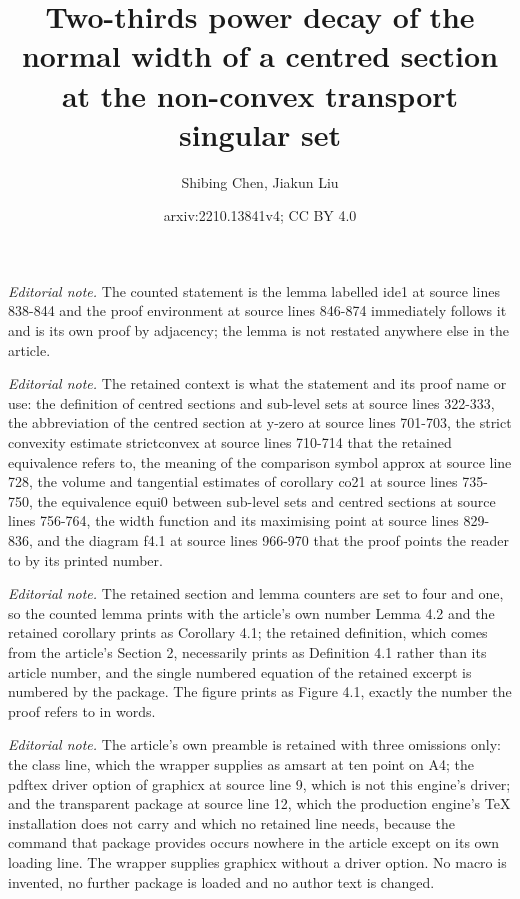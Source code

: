 \documentclass[10pt,a4paper]{amsart}
\title{Two-thirds power decay of the normal width of a centred section at the non-convex transport singular set}
\author{Shibing Chen, Jiakun Liu}
\date{arxiv:2210.13841v4; CC BY 4.0}
\theoremstyle{plain}
\newcommand{\0}{\textbf{0}}
\numberwithin{equation}{section}
\numberwithin{equation}{section}
\numberwithin{figure}{section}
\begin{document}
\maketitle
\setcounter{section}{4}
\setcounter{lemma}{1}
\noindent\textit{Editorial note.} The counted statement is the lemma labelled ide1 at source lines 838-844 and the proof environment at source lines 846-874 immediately follows it and is its own proof by adjacency; the lemma is not restated anywhere else in the article.\par\medskip
\noindent\textit{Editorial note.} The retained context is what the statement and its proof name or use: the definition of centred sections and sub-level sets at source lines 322-333, the abbreviation of the centred section at y-zero at source lines 701-703, the strict convexity estimate strictconvex at source lines 710-714 that the retained equivalence refers to, the meaning of the comparison symbol approx at source line 728, the volume and tangential estimates of corollary co21 at source lines 735-750, the equivalence equi0 between sub-level sets and centred sections at source lines 756-764, the width function and its maximising point at source lines 829-836, and the diagram f4.1 at source lines 966-970 that the proof points the reader to by its printed number.\par\medskip
\noindent\textit{Editorial note.} The retained section and lemma counters are set to four and one, so the counted lemma prints with the article's own number Lemma 4.2 and the retained corollary prints as Corollary 4.1; the retained definition, which comes from the article's Section 2, necessarily prints as Definition 4.1 rather than its article number, and the single numbered equation of the retained excerpt is numbered by the package. The figure prints as Figure 4.1, exactly the number the proof refers to in words.\par\medskip
\noindent\textit{Editorial note.} The article's own preamble is retained with three omissions only: the class line, which the wrapper supplies as amsart at ten point on A4; the pdftex driver option of graphicx at source line 9, which is not this engine's driver; and the transparent package at source line 12, which the production engine's TeX installation does not carry and which no retained line needs, because the command that package provides occurs nowhere in the article except on its own loading line. The wrapper supplies graphicx without a driver option. No macro is invented, no further package is loaded and no author text is changed.\par\medskip
\end{document}
